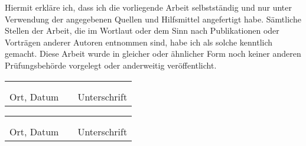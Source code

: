\documentclass{scrartcl}%
\begin{document}
	Hiermit erkläre ich, dass ich die vorliegende Arbeit selbstständig und nur unter Verwendung der angegebenen
	Quellen und Hilfsmittel angefertigt habe. Sämtliche Stellen der Arbeit, die im Wortlaut oder dem Sinn nach
	Publikationen oder Vorträgen anderer Autoren entnommen sind, habe ich als solche kenntlich gemacht. Diese
	Arbeit wurde in gleicher oder ähnlicher Form noch keiner anderen Prüfungsbehörde vorgelegt oder anderweitig
	veröffentlicht.
	
	\vspace{2cm}
	
	\begin{tabular}{lp{2em}l}
		\hspace{4cm} && \hspace{7cm} \\ \cline{1-1}\cline{3-3} \\
		Ort, Datum && Unterschrift
	\end{tabular}
	\vspace{1cm}

	\begin{tabular}{lp{2em}l}
	\hspace{4cm} && \hspace{7cm} \\ \cline{1-1}\cline{3-3} \\
	Ort, Datum && Unterschrift
	\end{tabular}
\end{document}

